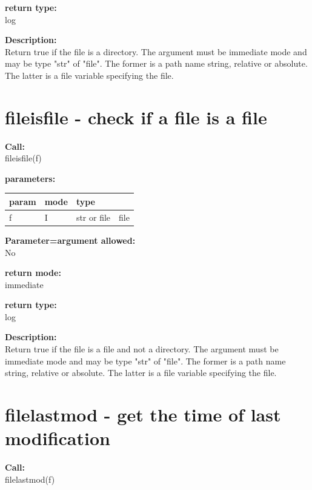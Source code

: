         {\bf return type:} \\
        log
        
        {\bf Description:} \\
        Return true if the file is a directory. The argument must be immediate
        mode and may be type "str" of "file". The former is a path name string,
        relative or absolute. The latter is a file variable specifying the
        file.
 


    \section{fileisfile - check if a file is a file}\label{sec:iffileisfile}
        
        {\bf Call:} \\
        fileisfile(f)
        
        {\bf parameters:} \\
        \begin{tabular}{| l | l | l | l |}
        \hline
        param  & mode & type & \\
        \hline \hline
        f & I & str or file & file \\ \hline
        \end{tabular}
        
        {\bf Parameter=argument allowed:} \\
        No
        
        {\bf return mode:} \\
        immediate

        {\bf return type:} \\
        log
        
        {\bf Description:} \\
        Return true if the file is a file and not a directory. The argument
        must be immediate mode and may be type "str" of "file". The former is a
        path name string, relative or absolute. The latter is a file variable
        specifying the file.
 


    \section{filelastmod - get the time of last modification}\label{sec:iffilelastmod}
        
        {\bf Call:} \\
        filelastmod(f)
        
